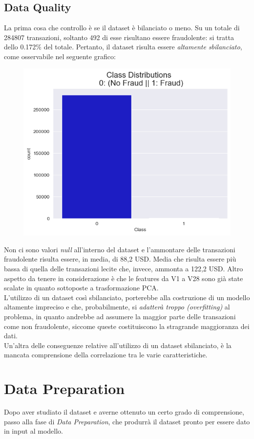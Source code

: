 \documentclass[]{article}
\begin{document}
    \subsection{Data Quality}
        La prima cosa che controllo è se il dataset è bilanciato o meno. Su un totale di 284807 transazioni, soltanto 492 di esse risultano essere fraudolente: si tratta dello 0.172\% del totale. Pertanto, il dataset risulta essere \textit{altamente sbilanciato}, come osservabile nel seguente grafico:
        \begin{figure}[H]
            \centering
            \includegraphics[width=.6\textwidth]{img/classDistribution.png}
            \caption[short]{}
        \end{figure}

        Non ci sono valori \textit{null} all'interno del dataset e l'ammontare delle transazioni fraudolente risulta essere, in media, di 88,2 USD. Media che risulta essere più bassa di quella delle transazioni lecite che, invece, ammonta a 122,2 USD. Altro aspetto da tenere in considerazione è che le features da V1 a V28 sono già state scalate in quanto sottoposte a trasformazione PCA.\\
        L'utilizzo di un dataset così sbilanciato, porterebbe alla costruzione di un modello altamente impreciso e che, probabilmente, si \textit{adatterà troppo (overfitting)} al problema, in quanto andrebbe ad assumere la maggior parte delle transazioni come non fraudolente, siccome queste costituiscono la stragrande maggioranza dei dati.\\
        Un'altra delle conseguenze relative all'utilizzo di un dataset sbilanciato, è la mancata comprensione della correlazione tra le varie caratteristiche.

\section{Data Preparation}
    Dopo aver studiato il dataset e averne ottenuto un certo grado di comprensione, passo alla fase di \textit{Data Preparation}, che produrrà il dataset pronto per essere dato in input al modello.
\end{document}
